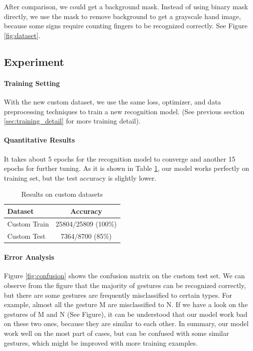 \documentclass[10pt,twocolumn,letterpaper]{article}
\begin{document}
 After comparison, we could get a background mask. Instead of using binary mask directly, we use the mask to remove background to get a grayscale hand image, because some signs require counting fingers to be recognized correctly. See Figure \ref{fig:dataset}.


\subsection{Experiment}

\paragraph{Training Setting}
With the new custom dataset, we use the same loss, optimizer, and data preprocessing techniques to train a new recognition model. (See previous section \ref{sec:training_detail} for more training detail).

\paragraph{Quantitative Results}
It takes about 5 epochs for the recognition model to converge and another 15 epochs for further tuning. As it is shown in Table \ref{table:result}, our model works perfectly on training set, but the test accuracy is slightly lower.

\begin{table}[h]
\begin{center}
\begin{tabular}{|l|c|}
\hline
Dataset & Accuracy \\
\hline\hline
Custom Train & 25804/25809 (100\%) \\
Custom Test & 7364/8700 (85\%) \\
\hline
\end{tabular}
\end{center}
\caption{Results on custom datasets}
\label{table:result}
\end{table}

\paragraph{Error Analysis} Figure \ref{fig:confusion} shows the confusion matrix on the custom test set. We can observe from the figure that the majority of gestures can be recognized correctly, but there are some gestures are frequently misclassified to certain types. For example, almost all the gesture M are misclassified to N. If we have a look on the gestures of M and N (See Figure), it can be understood that our model work bad on these two ones, because they are similar to each other. In summary, our model work well on the most part of cases, but can be confused with some similar gestures, which might be improved with more training examples.
\end{document}
